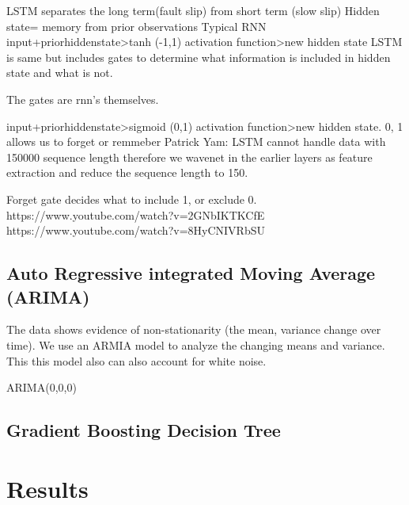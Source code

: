 \documentclass[]{llncs} %
\begin{document}
LSTM separates the long term(fault slip) from short term (slow slip)
Hidden state= memory from prior observations
Typical RNN input+priorhiddenstate>tanh (-1,1) activation function>new hidden state
LSTM is same but includes gates to determine what information is included in hidden state and what is not.

The gates are rnn's themselves.

input+priorhiddenstate>sigmoid (0,1) activation function>new hidden state. 0, 1 allows us to forget or remmeber 
Patrick Yam: LSTM cannot handle data with 150000 sequence length therefore we wavenet in the earlier layers as feature extraction and reduce the sequence length to 150.\par

Forget gate decides what to include 1, or exclude 0. 
https://www.youtube.com/watch?v=2GNbIKTKCfE
https://www.youtube.com/watch?v=8HyCNIVRbSU

\subsection{Auto Regressive integrated Moving Average (ARIMA)}
The data shows evidence of non-stationarity (the mean, variance change over time). We use an ARMIA model to analyze the changing means and variance. This this model also can also account for white noise.\par ARIMA(0,0,0)

\subsection{Gradient Boosting Decision Tree}


\section{Results}



\end{document}
